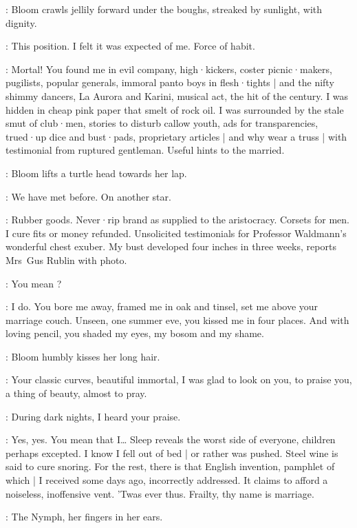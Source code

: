 :
Bloom crawls jellily forward under the boughs,
streaked by sunlight,
with dignity.

\Bloom:
This position.
I felt it was expected of me.
Force of habit.

\Nymph:
Mortal!
You found me in evil company,
high·kickers,
coster picnic·makers,
pugilists,
popular generals,
immoral panto boys in flesh·tights |
and the nifty shimmy dancers,
La Aurora and Karini,
musical act,
the hit of the century.
I was hidden in cheap pink paper that smelt of rock oil.
I was surrounded by the stale smut of club·men,
stories to disturb callow youth,
ads for transparencies,
trued·up dice and bust·pads,
proprietary articles |
%
and why wear a truss |
with testimonial from ruptured gentleman.
Useful hints to the married.

:
Bloom lifts a turtle head towards her lap.

\Bloom:
We have met before.
On another star.

\Nymph:
Rubber goods.
Never·rip brand as supplied to the aristocracy.
Corsets for men.
I cure fits or money refunded.
Unsolicited testimonials for Professor Waldmann's wonderful chest exuber.
My bust developed four inches in three weeks,
reports Mrs~Gus Rublin with photo.

\Bloom:
You mean ?

\Nymph:
I do.
You bore me away,
framed me in oak and tinsel,
set me above your marriage couch.
Unseen,
one summer eve,
you kissed me in four places.
And with loving pencil,
you shaded my eyes,
my bosom and my shame.

:
Bloom humbly kisses her long hair.

\Bloom:
Your classic curves,
beautiful immortal,
I was glad to look on you,
to praise you,
a thing of beauty,
almost to pray.

\Nymph:
During dark nights,
I heard your praise.%

\Bloom:
Yes,
yes.
You mean that I…
Sleep reveals the worst side of everyone,
children perhaps excepted.
I know I fell out of bed |
or rather was pushed.
Steel wine is said to cure snoring.
For the rest,
there is that English invention,
pamphlet of which |
I received some days ago,
incorrectly addressed.
It claims to afford a noiseless,
inoffensive vent.
'Twas ever thus.
Frailty,
thy name is marriage.

:
The Nymph,
her fingers in her ears.

